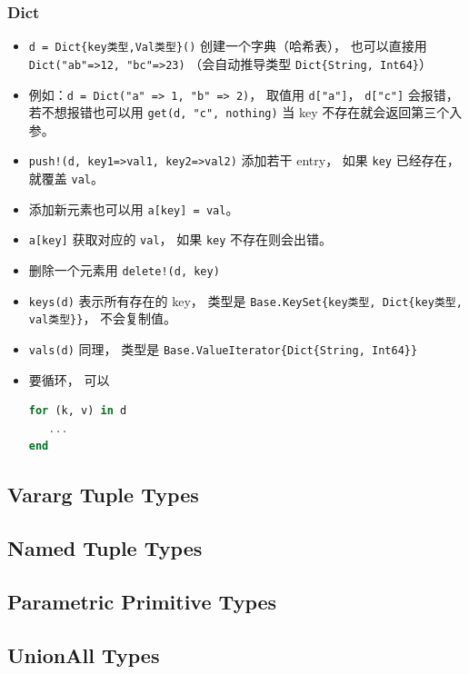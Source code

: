 \subsubsection{Dict}
\begin{itemize}
\item \verb`d = Dict{key类型,Val类型}()` 创建一个字典（哈希表）， 也可以直接用 \verb`Dict("ab"=>12, "bc"=>23)` （会自动推导类型 \verb`Dict{String, Int64}`）
\item 例如：\verb`d = Dict("a" => 1, "b" => 2)`， 取值用 \verb`d["a"]`， \verb`d["c"]` 会报错， 若不想报错也可以用 \verb`get(d, "c", nothing)` 当 key 不存在就会返回第三个入参。
\item \verb`push!(d, key1=>val1, key2=>val2)` 添加若干 entry， 如果 \verb`key` 已经存在， 就覆盖 \verb`val`。
\item 添加新元素也可以用 \verb`a[key] = val`。
\item \verb`a[key]` 获取对应的 \verb`val`， 如果 \verb`key` 不存在则会出错。
\item 删除一个元素用 \verb`delete!(d, key)`
\item \verb`keys(d)` 表示所有存在的 key， 类型是 \verb`Base.KeySet{key类型, Dict{key类型, val类型}}`， 不会复制值。
\item \verb`vals(d)` 同理， 类型是 \verb`Base.ValueIterator{Dict{String, Int64}}`
\item 要循环， 可以
\begin{lstlisting}[language=julia]
for (k, v) in d
   ...
end
\end{lstlisting}
\end{itemize}


\subsection{Vararg Tuple Types}

\subsection{Named Tuple Types}

\subsection{Parametric Primitive Types}

\subsection{UnionAll Types}

